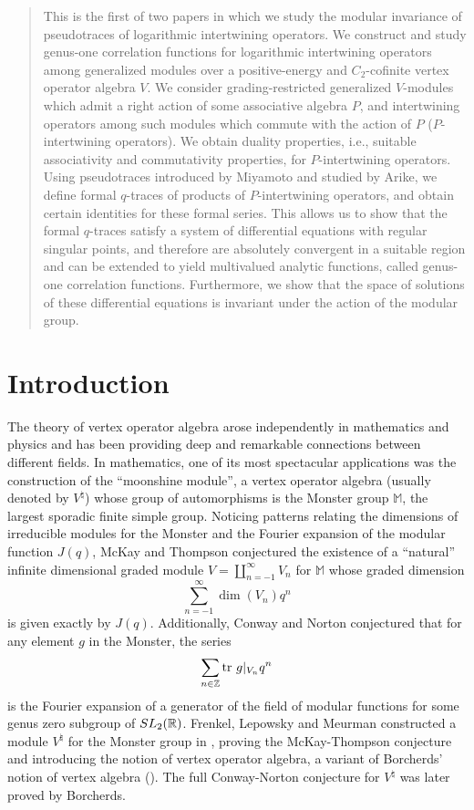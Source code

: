 \documentclass[12pt]{article}
\begin{document}
\begin{abstract}
This is the first of two papers in which we study the modular invariance of 
pseudotraces of logarithmic intertwining operators.
We construct and study genus-one correlation functions for logarithmic
intertwining operators among generalized modules over a positive-energy and 
$C_2$-cofinite vertex operator algebra $V$.
We consider grading-restricted generalized $V$-modules which admit a right
action of some associative algebra $P$, and intertwining operators among
such modules which commute with the action of $P$ ($P$-intertwining operators).
We obtain duality properties, i.e., suitable associativity and commutativity
properties, for $P$-intertwining operators. Using pseudotraces introduced by
Miyamoto and studied by Arike, we define formal $q$-traces of products of
$P$-intertwining operators, and obtain certain identities for these formal
series. This allows us to show that the formal $q$-traces satisfy
a system of differential equations with regular singular points, and
therefore are absolutely convergent in a suitable region and can be extended
to yield multivalued analytic functions, called genus-one correlation functions.
Furthermore, we show that the space of solutions of these differential
equations is invariant under the action of the modular group.
\end{abstract}


\vspace{2em}

\section{Introduction} 

The theory of vertex operator algebra arose independently in mathematics and
physics and has been providing deep and remarkable connections between
different fields. In mathematics, one of its most spectacular applications
was the construction of the ``moonshine module'', a vertex operator
algebra (usually denoted by $V^\natural$) whose group of automorphisms
is the Monster group $\mathbb M$, the largest sporadic finite simple group.
Noticing patterns relating the dimensions of irreducible modules for
the Monster and the Fourier expansion of the modular function $J(q)$,
McKay and Thompson conjectured the existence of a ``natural'' infinite
dimensional graded module $V = \coprod_{n= -1}^\infty V_n$ for $\mathbb M$
whose graded dimension
$$
  \sum_{n=-1}^\infty \dim(V_n)q^n
$$
is given exactly by $J(q)$. Additionally, Conway and Norton conjectured
that for any element $g$ in the Monster, the series
$$
  \sum_{n\in \mathbb{Z}}\mbox{\rm tr}\ g|_{V_n} q^n
$$
is the Fourier expansion of a generator of the field of modular functions
for some genus zero subgroup of $SL_2(\mathbb{R})$.
Frenkel, Lepowsky and Meurman constructed a module $V^\natural$ for the Monster
group in \cite{FLM}, proving the McKay-Thompson conjecture and introducing
the notion of vertex operator algebra, a variant of Borcherds' notion of
vertex algebra (\cite{B}). The full Conway-Norton conjecture
for $V^\natural$ was later proved by Borcherds.
\end{document}
